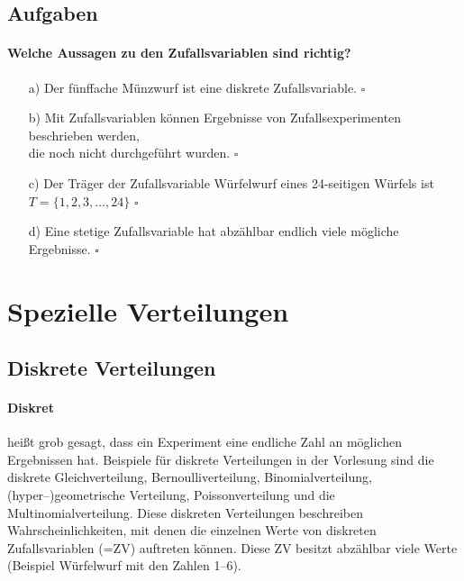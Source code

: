 \documentclass[a4paper]{article}
\begin{document}
\clearpage

\subsection{Aufgaben}
\paragraph{Welche Aussagen zu den Zufallsvariablen sind richtig?}
\begin{itemize}
    \item[a)] Der fünffache Münzwurf ist eine diskrete Zufallsvariable. \hfill $\square$
    \item[b)] Mit Zufallsvariablen können Ergebnisse von Zufallsexperimenten beschrieben werden,\\ die noch nicht durchgeführt wurden. \hfill $\square$
    \item[c)] Der Träger der Zufallsvariable Würfelwurf eines 24-seitigen Würfels ist\\ $T = \{1, 2, 3, \hdots, 24\}$ \hfill $\square$
    \item[d)] Eine stetige Zufallsvariable hat abzählbar endlich viele mögliche Ergebnisse. \hfill $\square$
\end{itemize}

\clearpage


\section{Spezielle Verteilungen} \label{sec:Distr}

\subsection{Diskrete Verteilungen} \label{sec:discretedistr}
\paragraph{Diskret} heißt grob gesagt, dass ein Experiment eine endliche Zahl an möglichen Ergebnissen hat. Beispiele für diskrete Verteilungen in der Vorlesung sind die diskrete Gleichverteilung, Bernoulliverteilung, Binomialverteilung, (hyper--)geometrische Verteilung, Poissonverteilung und die Multinomialverteilung. Diese diskreten Verteilungen beschreiben Wahrscheinlichkeiten, mit denen die einzelnen Werte von diskreten Zufallsvariablen (=ZV) auftreten können. Diese ZV besitzt abzählbar viele Werte (Beispiel Würfelwurf mit den Zahlen 1--6).
\end{document}

